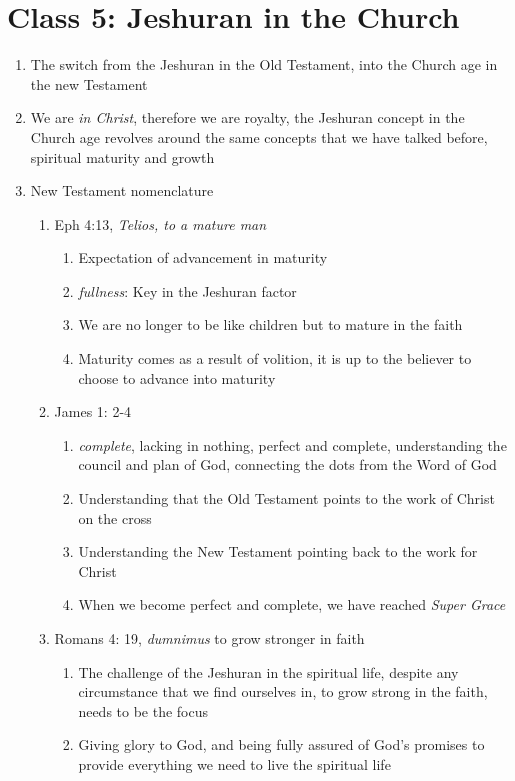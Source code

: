 \documentclass[11pt]{article}
\begin{document}
\section*{Class 5: Jeshuran in the Church}
\begin{enumerate}
	\item The switch from the Jeshuran in the Old Testament, into the Church age in the new Testament
	\item We are \emph{in Christ}, therefore we are royalty, the Jeshuran concept in the Church age revolves around the same concepts that we have talked before, spiritual maturity and growth
	\item New Testament nomenclature
	\begin{enumerate}
		\item Eph 4:13, \emph{Telios, to a mature man}
		\begin{enumerate}
			\item Expectation of advancement in maturity
			\item \emph{fullness}: Key in the Jeshuran factor
			\item We are no longer to be like children but to mature in the faith
			\item Maturity comes as a result of volition, it is up to the believer to choose to advance into maturity
		\end{enumerate}
		\item James 1: 2-4
		\begin{enumerate}
			\item \emph{complete}, lacking in nothing, perfect and complete, understanding the council and plan of God, connecting the dots from the Word of God
			\item Understanding that the Old Testament points to the work of Christ on the cross
			\item Understanding the New Testament pointing back to the work for Christ
			\item When we become perfect and complete, we have reached \emph{Super Grace}
		\end{enumerate}
		\item Romans 4: 19, \emph{dumnimus} to grow stronger in faith
		\begin{enumerate}
			\item The challenge of the Jeshuran in the spiritual life, despite any circumstance that we find ourselves in, to grow strong in the faith, needs to be the focus
			\item Giving glory to God, and being fully assured of God's promises to provide everything we need to live the spiritual life

\end{enumerate}
\end{enumerate}
\end{enumerate}
\end{document}
